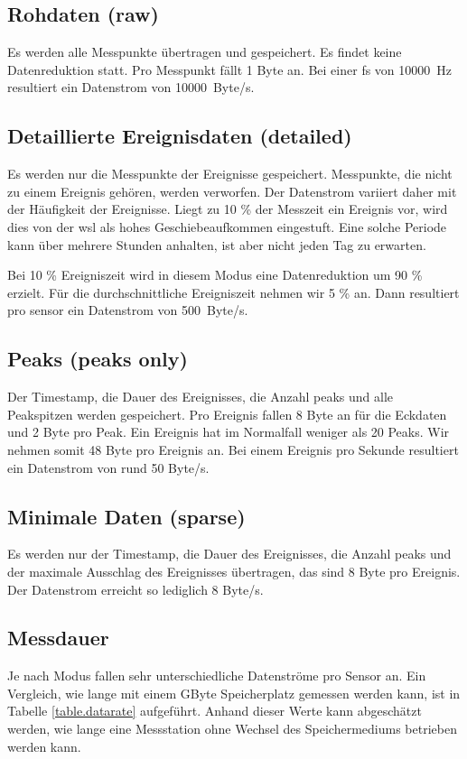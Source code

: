 \subsection{Rohdaten (raw)}
Es werden alle Messpunkte übertragen und gespeichert. Es findet keine Datenreduktion statt. Pro Messpunkt fällt 1 Byte an. Bei einer \gls{fs} von 10000~Hz resultiert ein Datenstrom von 10000~Byte/s.

\subsection{Detaillierte Ereignisdaten (detailed)}
Es werden nur die Messpunkte der Ereignisse gespeichert. Messpunkte, die nicht zu einem Ereignis gehören, werden verworfen. Der Datenstrom variiert daher mit der Häufigkeit der Ereignisse. Liegt zu 10 \% der Messzeit ein Ereignis vor, wird dies von der \gls{wsl} als hohes Geschiebeaufkommen eingestuft. Eine solche Periode kann über mehrere Stunden anhalten, ist aber nicht jeden Tag zu erwarten.

Bei 10 \% Ereigniszeit wird in diesem Modus eine Datenreduktion um 90 \% erzielt. Für die durchschnittliche Ereigniszeit nehmen wir 5 \% an. Dann resultiert pro \gls{sensor} ein Datenstrom von 500~Byte/s.

\subsection{Peaks (peaks only)}
Der Timestamp, die Dauer des Ereignisses, die Anzahl \glspl{peak} und alle Peakspitzen werden gespeichert. Pro Ereignis fallen 8 Byte an für die Eckdaten und 2 Byte pro Peak. Ein Ereignis hat im Normalfall weniger als 20 Peaks. Wir nehmen somit 48 Byte pro Ereignis an. Bei einem Ereignis pro Sekunde resultiert ein Datenstrom von rund 50 Byte/s.

\subsection{Minimale Daten (sparse)}
Es werden nur der Timestamp, die Dauer des Ereignisses, die Anzahl \glspl{peak} und der maximale Ausschlag des Ereignisses übertragen, das sind 8 Byte pro Ereignis. Der Datenstrom erreicht so lediglich 8 Byte/s.

\subsection{Messdauer}
Je nach Modus fallen sehr unterschiedliche Datenströme pro Sensor an. Ein Vergleich, wie lange mit einem GByte Speicherplatz gemessen werden kann, ist in Tabelle \ref{table.datarate} aufgeführt. Anhand dieser Werte kann abgeschätzt werden, wie lange eine Messstation ohne Wechsel des Speichermediums betrieben werden kann.


